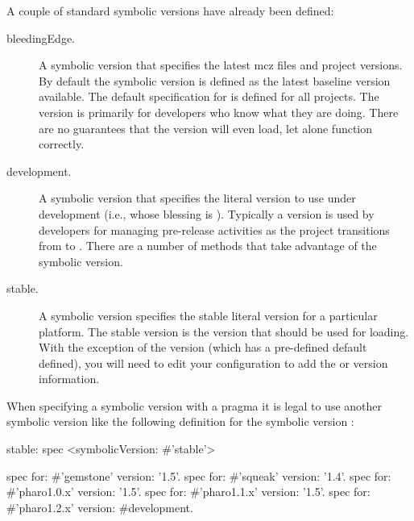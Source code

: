 \documentclass[a4paper,10pt,twoside]{book}
\begin{document}
A couple of standard symbolic versions have already been defined:

\begin{description}
\item [bleedingEdge.]  A symbolic version that specifies the latest mcz files and project versions. By default the  symbolic version is defined as the latest baseline version available. The default specification for  is defined for all projects. The  version is primarily for developers who know what they are doing. There are no guarantees that the  version will even load, let alone function correctly.

\item [development.] A symbolic version that specifies the literal version to use under development (i.e., whose blessing is ). Typically a  version is used by developers for managing pre-release activities as the project transitions from  to . There are a number of  methods that take advantage of the  symbolic version.

\item [stable.] A symbolic version specifies the stable literal version for a particular platform. The stable version is the version that should be used for loading.
With the exception of the  version (which has a pre-defined default defined), you will need to edit your configuration to add the  or  version information.
\end{description}



When specifying a symbolic version with a  pragma it is legal to use another symbolic version like the following definition for the symbolic version :

\begin{code}{}
stable: spec
	<symbolicVersion: #'stable'>

	spec for: #'gemstone' version: '1.5'.
	spec for: #'squeak' version: '1.4'.
	spec for: #'pharo1.0.x' version: '1.5'.
	spec for: #'pharo1.1.x' version: '1.5'.
	spec for: #'pharo1.2.x' version: #development.
\end{code}
\end{document}

